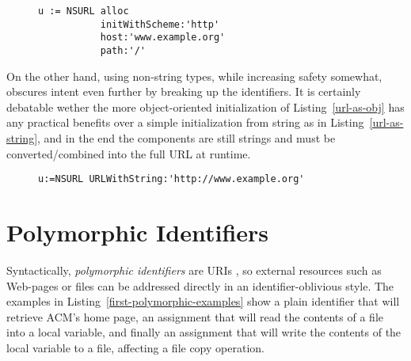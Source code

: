 \documentclass[preprint,authoryear]{acm_proc_article-sp}
\begin{document}
\begin{figure}[htbp]
\begin{lstlisting}[style=L,label=url-as-obj,caption=URL initialized in an object-oriented fashion.]
u := NSURL alloc
           initWithScheme:'http'
           host:'www.example.org'
           path:'/' 
\end{lstlisting}
\end{figure}

On the other hand, using non-string types, while increasing safety somewhat,
obscures intent even further by breaking up the identifiers.
It is certainly debatable wether the more object-oriented
initialization of Listing~\ref{url-as-obj}  has any practical benefits over a
simple initialization from string as in Listing~\ref{url-as-string}, and in
the end the components are still strings and must be converted/combined
into the full URL at runtime.


\begin{figure}[htbp]
\begin{lstlisting}[style=L,label=url-as-string,caption=URL initialized with a single string.]
u:=NSURL URLWithString:'http://www.example.org'
\end{lstlisting}
\end{figure}


\section{Polymorphic Identifiers}
\label{polymorphic-identifiers}

Syntactically, \emph{polymorphic identifiers} are URIs \cite{rfc3986}, so external resources
such as Web-pages or files can be addressed directly in an identifier-oblivious
style.  The examples in Listing~\ref{first-polymorphic-examples} show a plain
identifier that will retrieve ACM's home page, an assignment that will read
the contents of a file into a local variable, and finally an assignment that will
write the contents of the local variable to a file, affecting a file copy operation.
\end{document}
